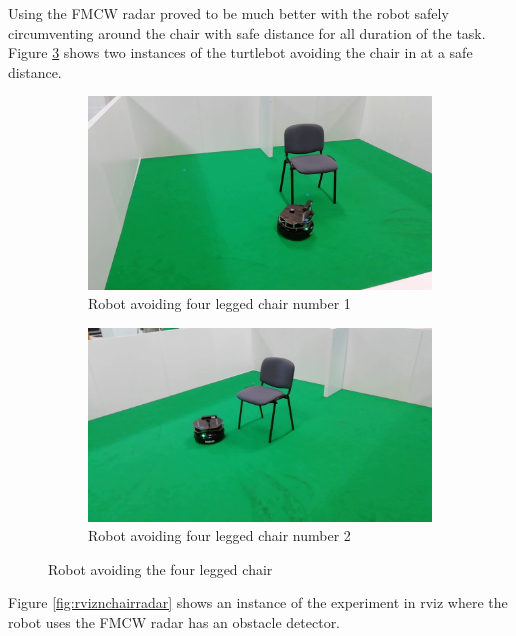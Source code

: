 Using the \ac{FMCW} radar proved to be much better with the robot safely circumventing around the chair with safe distance for all duration of the task. Figure \ref{fig:nchairRS} shows two instances of the turtlebot avoiding the chair in at a safe distance.
\begin{figure}[ht!]
  \centering
  \begin{subfigure}[b]{0.49\linewidth}
    \includegraphics[width=\linewidth]{imgs/chapter5/nchairRS.png}
     \caption{Robot avoiding four legged chair number 1}
     \label{fig::nchairRS1}
  \end{subfigure}
  \begin{subfigure}[b]{0.49\linewidth}
    \includegraphics[width=\linewidth]{imgs/chapter5/nchairRS2.png}
    \caption{Robot avoiding four legged chair number 2}
    \label{fig::nchairRS2}
  \end{subfigure}
  \caption{Robot avoiding the four legged chair}
  \label{fig:nchairRS}
\end{figure}
Figure \ref{fig:rviznchairradar} shows an instance of the experiment in rviz where the robot uses the \ac{FMCW} \ac{radar} has an obstacle detector.
